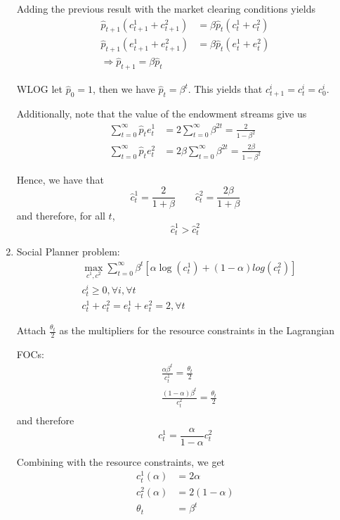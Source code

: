 \documentclass[12pt]{article}
\newcommand{\1}{{\bf 1}} %
\newcommand{\bra}[1]{\left[#1\right]}
\begin{document}
\begin{enumerate}[(1)]
	Adding the previous result with the market clearing conditions yields
	\[ \begin{split}
	\hat{p}_{t+1}(c_{t+1}^1+c_{t+1}^2) & = \beta \hat{p}_t(c_{t}^1+c_{t}^2)\\
	\hat{p}_{t+1}(e_{t+1}^1+e_{t+1}^2) & = \beta \hat{p}_t(e_{t}^1+e_{t}^2)\\
	\Rightarrow \hat{p}_{t+1}=\beta \hat{p}_t
	\end{split} \]
	
	WLOG let $\hat{p}_0=1$, then we have $\hat{p}_t=\beta^t$. This yields that $c_{t+1}^i=c_t^i = c_0^i$. 
	
	Additionally, note that the value of the endowment streams give us
	\[
	\begin{split}
	\sum_{t=0}^{\infty}\hat{p}_te_t^1 &= 2 \sum_{t=0}^{\infty}\beta^{2t}= \frac{2}{1-\beta^2}\\
	\sum_{t=0}^{\infty}\hat{p}_te_t^2 &= 2\beta \sum_{t=0}^{\infty}\beta^{2t}= \frac{2\beta}{1-\beta^2}
	\end{split}
	\]
	
	Hence, we have that
	\[
	\hat{c}^1_t = \frac{2}{1+\beta}\qquad \hat{c}^2_t = \frac{2\beta}{1+\beta}
	\]
	and therefore, for all $t$,
	\[\hat{c}^1_t > \hat{c}^2_t\]

	
	
	\item
	Social Planner problem:
	\[
	\begin{split}
	&\max_{c^1,c^2}\sum_{t=0}^{\infty}\beta^t \bra{\alpha \log(c_t^1)+(1-\alpha)log(c_t^2)}\\
	& c_t^i\geq 0, \forall i, \forall t\\
	& c_t^1+c_t^2=e_t^1+e_t^2=2, \forall t
	\end{split}
	\]
	
	Attach $\frac{\theta_t}{2}$ as the multipliers for the resource constraints in the Lagrangian
	
	FOCs:
	\[
	\begin{split}
	&\frac{\alpha \beta^t}{c_t^1}=\frac{\theta_t}{2}\\
	&\frac{(1-\alpha) \beta^t}{c_t^2}=\frac{\theta_t}{2}\\
	\end{split}
	\]
	and therefore
	\[
	c_t^1 = \frac{\alpha}{1-\alpha}c_t^2
	\]
	
	Combining with the resource constraints, we get
	\[
	\begin{split}
	c_t^1(\alpha)&=2\alpha\\
	c_t^2(\alpha)&=2(1-\alpha)\\
	\theta_t&=\beta^t
	\end{split}
	\]
	

\end{enumerate}
\end{document}
